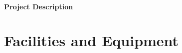 \documentclass[12pt]{article}
\begin{document}
\begin{center}
  {\Large\bf Project Description}
\end{center}
\nopagebreak


\nopagebreak













\section{Facilities and Equipment}



\end{document}
